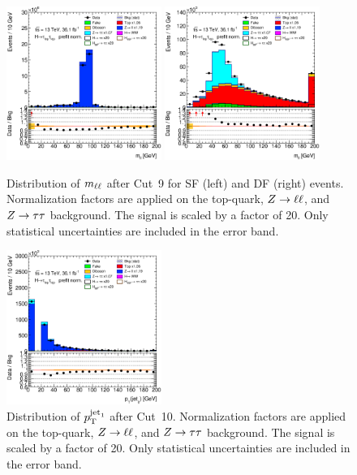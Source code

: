 
\begin{figure}[htb]
    \centering
    \includegraphics[width=0.45\textwidth]{./plots/event_selection/eemm-CutOS-mvis-lin.eps}
    \includegraphics[width=0.45\textwidth]{./plots/event_selection/emme-CutOS-mvis-lin.eps}
    \caption{Distribution of $m_{\ell\ell}$ after Cut~9 for SF (left) and DF (right) events.
             Normalization factors are applied on the top-quark, $Z \to \ell \ell$, and $Z \to \tau \tau$ background.
             The signal is scaled by a factor of 20.
             Only statistical uncertainties are included in the error band.}\label{fig:event_selection:cutflow:mll}
\end{figure}

\begin{figure}[htb]
    \centering
    \includegraphics[width=0.45\textwidth]{./plots/event_selection/ll-CutMVis-JetPt0-lin.eps}
    \caption{Distribution of $p_\text{T}^{\text{jet}_1}$ after Cut~10.
             Normalization factors are applied on the top-quark, $Z \to \ell \ell$, and $Z \to \tau \tau$ background.
             The signal is scaled by a factor of 20.
             Only statistical uncertainties are included in the error band.}\label{fig:event_selection:cutflow:jetlead}
\end{figure}

